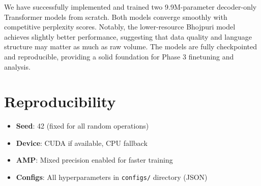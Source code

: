 \documentclass[11pt,a4paper]{article}
\begin{document}
We have successfully implemented and trained two 9.9M-parameter decoder-only Transformer models from scratch. Both models converge smoothly with competitive perplexity scores. Notably, the lower-resource Bhojpuri model achieves slightly better performance, suggesting that data quality and language structure may matter as much as raw volume. The models are fully checkpointed and reproducible, providing a solid foundation for Phase 3 finetuning and analysis.

\appendix

\section{Reproducibility}

\begin{itemize}
    \item \textbf{Seed}: 42 (fixed for all random operations)
    \item \textbf{Device}: CUDA if available, CPU fallback
    \item \textbf{AMP}: Mixed precision enabled for faster training
    \item \textbf{Configs}: All hyperparameters in \texttt{configs/} directory (JSON)
\end{itemize}
\end{document}
